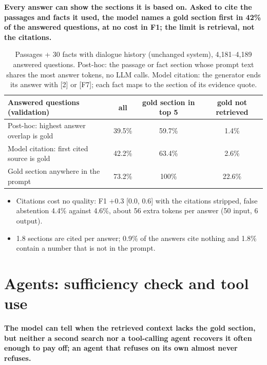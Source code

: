 \documentclass[11pt,a4paper]{article}
\begin{document}
\textbf{Every answer can show the sections it is based on. Asked to cite the passages and facts it
used, the model names a gold section first in 42\% of the answered questions, at no cost in F1;
the limit is retrieval, not the citations.}

\begin{table}[H]
\centering\small
\begin{tabular}{lccc}
\toprule
Answered questions (validation) & all & gold section in top 5 & gold not retrieved \\
\midrule
Post-hoc: highest answer overlap is gold & 39.5\% & 59.7\% & 1.4\% \\
Model citation: first cited source is gold & 42.2\% & 63.4\% & 2.6\% \\
Gold section anywhere in the prompt & 73.2\% & 100\% & 22.6\% \\
\bottomrule
\end{tabular}
\caption{Passages + 30 facts with dialogue history (unchanged system), 4,181--4,189 answered
questions. Post-hoc: the passage or fact section whose prompt text shares the most answer
tokens, no LLM calls. Model citation: the generator ends its answer with [2] or [F7]; each fact
maps to the section of its evidence quote.}
\label{tab:sources}
\end{table}

\begin{itemize}
\item Citations cost no quality: F1 $+0.3$ [0.0, 0.6] with the citations stripped, false abstention
  4.4\% against 4.6\%, about 56 extra tokens per answer (50 input, 6 output).
\item 1.8 sections are cited per answer; 0.9\% of the answers cite nothing and 1.8\% contain a number
  that is not in the prompt.
\end{itemize}

\section{Agents: sufficiency check and tool use}\label{sec:agents}

\textbf{The model can tell when the retrieved context lacks the gold section, but neither a second
search nor a tool-calling agent recovers it often enough to pay off; an agent that refuses on its own
almost never refuses.}
\end{document}
